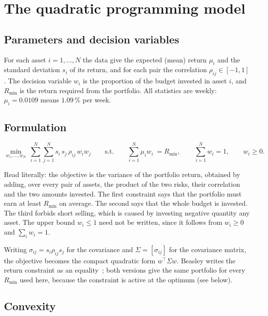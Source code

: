 \documentclass[10pt,a4paper]{article}
\begin{document}
\section{The quadratic programming model}

\subsection{Parameters and decision variables}

For each asset $i=1,\dots,N$ the data give the expected (mean) return $\mu_i$ and the standard
deviation $s_i$ of its return, and for each pair the correlation $\rho_{ij}\in[-1,1]$. The decision
variable $w_i$ is the proportion of the budget invested in asset $i$, and $R_{\min}$ is the return
required from the portfolio. All statistics are weekly: $\mu_i=0.0109$ means $1.09\,\%$ per week.

\subsection{Formulation}

\begin{equation}
\min_{w_1,\dots,w_N}\ \sum_{i=1}^{N}\sum_{j=1}^{N} s_i\,s_j\,\rho_{ij}\,w_i w_j
\qquad\text{s.t.}\qquad
\sum_{i=1}^{N}\mu_i w_i \ = R_{\min},\qquad
\sum_{i=1}^{N} w_i = 1,\qquad
w_i \ge 0 .
\label{eq:model}
\end{equation}

Read literally: the objective is the variance of the portfolio return, obtained by adding, over every
pair of assets, the product of the two risks, their correlation and the two amounts invested. The
first constraint says that the portfolio must earn at least $R_{\min}$ on average. The second says
that the whole budget is invested. The third forbids short selling, which is caused by investing negative quantity any asset. The upper bound $w_i\le1$ need
not be written, since it follows from $w_i\ge0$ and $\sum_i w_i=1$.

Writing $\sigma_{ij}=s_i\rho_{ij}s_j$ for the covariance and $\Sigma=[\sigma_{ij}]$ for the
covariance matrix, the objective becomes the compact quadratic form $w^\top\Sigma w$. Beasley writes
the return constraint as an equality~\cite{beasley2013}; both versions give the same portfolio for
every $R_{\min}$ used here, because the constraint is active at the optimum (see below).

\subsection{Convexity}
\end{document}

